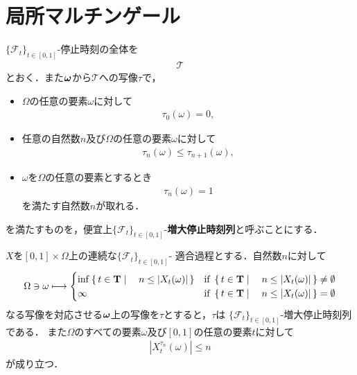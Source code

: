 \section{局所マルチンゲール}
	
	$\{\mathscr{F}_{t}\}_{t \in [0,1]}$-停止時刻の全体を
	\begin{align}
		\mathscr{T}
	\end{align}
	とおく．また${\boldsymbol \omega}$から$\mathscr{T}$への写像$\tau$で，
	\begin{itemize}
		\item $\Omega$の任意の要素$\omega$に対して
			\begin{align}
				\tau_{0}(\omega) = 0,
			\end{align}
			
		\item 任意の自然数$n$及び$\Omega$の任意の要素$\omega$に対して
			\begin{align}
				\tau_{n}(\omega) \leq \tau_{n+1}(\omega),
			\end{align}
			
		\item $\omega$を$\Omega$の任意の要素とするとき
			\begin{align}
				\tau_{n}(\omega) = 1
			\end{align}
			を満たす自然数$n$が取れる．
	\end{itemize}
	
	を満たすものを，便宜上$\{\mathscr{F}_{t}\}_{t \in [0,1]}$-{\bf 増大停止時刻列}と呼ぶことにする．
	
	\begin{screen}
		\begin{thm}[連続適合過程で作る増大停止時刻列]
		\label{thm:increasing_stopping_times_made_from_continuous_adapted_process}
			$X$を$[0,1] \times \Omega$上の連続な$\{\mathscr{F}_{t}\}_{t \in [0,1]}$-
			適合過程とする．自然数$n$に対して
			\begin{align}
				\Omega \ni \omega \longmapsto 
				\begin{cases}
					\operatorname*{inf}_{} \left\{\, t \in \mathbf{T} \mid \quad n \leq |X_t(\omega)|\, \right\} & \mbox{if } \left\{\, t \in \mathbf{T} \mid \quad n \leq |X_t(\omega)|\, \right\} \neq \emptyset \\
					\infty & \mbox{if } \left\{\, t \in \mathbf{T} \mid \quad n \leq |X_t(\omega)|\, \right\} = \emptyset
				\end{cases}
			\end{align}
			なる写像を対応させる${\boldsymbol \omega}$上の写像を$\tau$とすると，$\tau$は
			$\{\mathscr{F}_t\}_{t \in [0,1]}$-増大停止時刻列である．
			また$\Omega$のすべての要素$\omega$及び$[0,1]$の任意の要素$t$に対して
			\begin{align}
				\left|X^{\tau_n}_t(\omega)\right| \leq n
			\end{align}
			が成り立つ．
		\end{thm}
	\end{screen}
	
